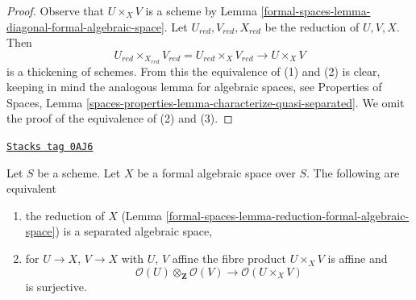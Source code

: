 \begin{proof}
Observe that $U \times_X V$ is a scheme by
Lemma \ref{formal-spaces-lemma-diagonal-formal-algebraic-space}.
Let $U_{red}, V_{red}, X_{red}$ be the reduction of $U, V, X$.
Then
$$
U_{red} \times_{X_{red}} V_{red} = U_{red} \times_X V_{red} \to U \times_X V
$$
is a thickening of schemes. From this the equivalence of (1) and (2)
is clear, keeping in mind the analogous lemma for algebraic spaces, see
Properties of Spaces, Lemma
\ref{spaces-properties-lemma-characterize-quasi-separated}.
We omit the proof of the equivalence of (2) and (3).
\end{proof}

\begin{lemma}
\label{formal-spaces-lemma-characterize-separated}
\href{https://stacks.math.columbia.edu/tag/0AJ6}{\texttt{Stacks tag 0AJ6}}

Let $S$ be a scheme. Let $X$ be a formal algebraic space over $S$.
The following are equivalent
\begin{enumerate}
\item the reduction of $X$
(Lemma \ref{formal-spaces-lemma-reduction-formal-algebraic-space}) is a separated
algebraic space,
\item for $U \to X$, $V \to X$ with $U$, $V$ affine
the fibre product $U \times_X V$ is affine and
$$
\mathcal{O}(U) \otimes_\mathbf{Z} \mathcal{O}(V)
\longrightarrow
\mathcal{O}(U \times_X V)
$$
is surjective.
\end{enumerate}
\end{lemma}

